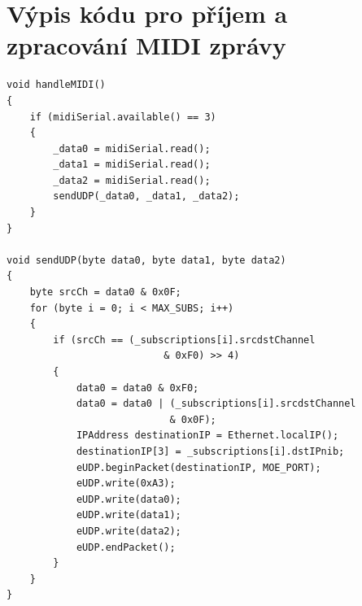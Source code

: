 \section{Výpis kódu pro příjem a zpracování \acs{MIDI} zprávy}\label{code:handleMIDI}
\begin{lstlisting}[caption=Výpis kódu pro příjem a zpracování MIDI zprávy]
void handleMIDI()
{
	if (midiSerial.available() == 3)
    {
        _data0 = midiSerial.read();
        _data1 = midiSerial.read();
        _data2 = midiSerial.read();
        sendUDP(_data0, _data1, _data2);
    }
}
	
void sendUDP(byte data0, byte data1, byte data2)
{
	byte srcCh = data0 & 0x0F;
	for (byte i = 0; i < MAX_SUBS; i++)
	{
		if (srcCh == (_subscriptions[i].srcdstChannel 
					       & 0xF0) >> 4)
		{
			data0 = data0 & 0xF0;
			data0 = data0 | (_subscriptions[i].srcdstChannel 
							& 0x0F);
			IPAddress destinationIP = Ethernet.localIP();
			destinationIP[3] = _subscriptions[i].dstIPnib;
			eUDP.beginPacket(destinationIP, MOE_PORT);
			eUDP.write(0xA3);
			eUDP.write(data0);
			eUDP.write(data1);
			eUDP.write(data2);
			eUDP.endPacket();
		}
	}
}
\end{lstlisting}

